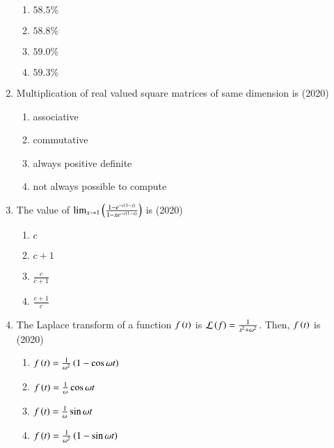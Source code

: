 \documentclass[journal]{IEEEtran}
\begin{document}
\begin{enumerate}
\begin{multicols}{2}
\begin{enumerate}
\item $58.5\%$
\item $58.8\%$
\item $59.0\%$
\item $59.3\%$
\end{enumerate}
\end{multicols}


\item Multiplication of real valued square matrices of same dimension is \hfill(2020)
\begin{multicols}{2}
\begin{enumerate}
\item associative
\item commutative
\item always positive definite
\item not always possible to compute
\end{enumerate}
\end{multicols}

\item The value of $\lim_{x\to 1}\left(\frac{1-e^{-c\left(1-x\right)}}{1-xe^{-c\left(1-x\right)}}\right)$ is \hfill(2020)
\begin{multicols}{2}
\begin{enumerate}
\item $c$
\item $c+1$
\item $\frac{c}{c+1}$
\item $\frac{c+1}{c}$
\end{enumerate}
\end{multicols}

\item The Laplace transform of a function $f\left(t\right)$ is $\mathcal{L}\left(f\right)=\frac{1}{s^{2}+\omega^{2}}$. Then, $f\left(t\right)$ is \hfill(2020)
\begin{multicols}{2}
\begin{enumerate}
\item $f\left(t\right)=\frac{1}{\omega^{2}}\left(1-\cos{\omega t}\right)$
\item $f\left(t\right)=\frac{1}{\omega}\cos{\omega t}$
\item $f\left(t\right)=\frac{1}{\omega}\sin{\omega t}$
\item $f\left(t\right)=\frac{1}{\omega^{2}}\left(1-\sin{\omega t}\right)$
\end{enumerate}
\end{multicols}
\end{enumerate}
\end{document}
